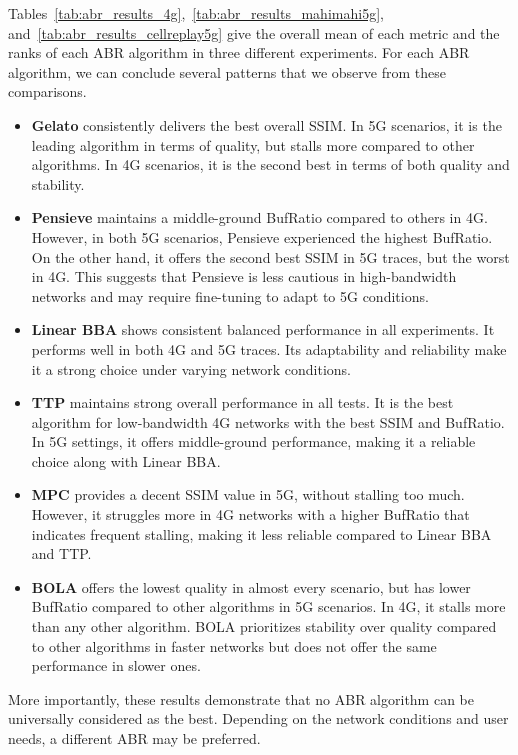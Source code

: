 Tables~\ref{tab:abr_results_4g},~\ref{tab:abr_results_mahimahi5g}, and~\ref{tab:abr_results_cellreplay5g} give the overall mean of each metric and the ranks of each ABR algorithm in three different experiments. For each ABR algorithm, we can conclude several patterns that we observe from these comparisons.

\begin{itemize}
    \item \textbf{Gelato} consistently delivers the best overall SSIM. In 5G scenarios, it is the leading algorithm in terms of quality, but stalls more compared to other algorithms. In 4G scenarios, it is the second best in terms of both quality and stability.
    
    \item \textbf{Pensieve} maintains a middle-ground BufRatio compared to others in 4G. However, in both 5G scenarios, Pensieve experienced the highest BufRatio. On the other hand, it offers the second best SSIM in 5G traces, but the worst in 4G. This suggests that Pensieve is less cautious in high-bandwidth networks and may require fine-tuning to adapt to 5G conditions.
    
    \item \textbf{Linear BBA} shows consistent balanced performance in all experiments. It performs well in both 4G and 5G traces. Its adaptability and reliability make it a strong choice under varying network conditions.
    
    \item \textbf{TTP} maintains strong overall performance in all tests. It is the best algorithm for low-bandwidth 4G networks with the best SSIM and BufRatio. In 5G settings, it offers middle-ground performance, making it a reliable choice along with Linear BBA.
    
    \item\textbf{MPC} provides a decent SSIM value in 5G, without stalling too much. However, it struggles more in 4G networks with a higher BufRatio that indicates frequent stalling, making it less reliable compared to Linear BBA and TTP.
    
    \item \textbf{BOLA} offers the lowest quality in almost every scenario, but has lower BufRatio compared to other algorithms in 5G scenarios. In 4G, it stalls more than any other algorithm. BOLA prioritizes stability over quality compared to other algorithms in faster networks but does not offer the same performance in slower ones.
\end{itemize}

More importantly, these results demonstrate that no ABR algorithm can be universally considered as the best. Depending on the network conditions and user needs, a different ABR may be preferred.

